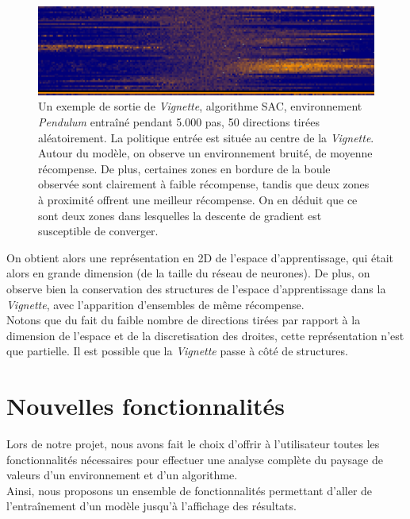 \documentclass[12pt]{article}
\begin{document}
\begin{figure}[htp]
    \centering
    \includegraphics[width=15cm]{Images/Vignette_pendulum}
    \caption{Un exemple de sortie de \emph{Vignette}, algorithme SAC, environnement \emph{Pendulum} entraîné pendant 5.000 pas, 50 directions tirées aléatoirement. La politique entrée est située au centre de la \emph{Vignette}. Autour du modèle, on observe un environnement bruité, de moyenne récompense. De plus, certaines zones en bordure de la boule observée sont clairement à faible récompense, tandis que deux zones à proximité offrent une meilleur récompense. On en déduit que ce sont deux zones dans lesquelles la descente de gradient est susceptible de converger.}
    \label{fig:vignettePendulum}
\end{figure}

\newpage
On obtient alors une représentation en 2D de l’espace d’apprentissage, qui était alors en grande dimension (de la taille du réseau de neurones). De plus, on observe bien la conservation des structures de l'espace d'apprentissage dans la \emph{Vignette}, avec l'apparition d'ensembles de même récompense. \\

Notons que du fait du faible nombre de directions tirées par rapport à la dimension de l'espace et de la discretisation des droites, cette représentation n’est que partielle. Il est possible que la \emph{Vignette} passe à côté de structures. \\

\section{Nouvelles fonctionnalités}

Lors de notre projet, nous avons fait le choix d'offrir à l'utilisateur toutes les fonctionnalités nécessaires pour effectuer une analyse complète du paysage de valeurs d'un environnement et d'un algorithme. \\

Ainsi, nous proposons un ensemble de fonctionnalités permettant d'aller de l'entraînement d'un modèle jusqu'à l'affichage des résultats. \\
\end{document}
